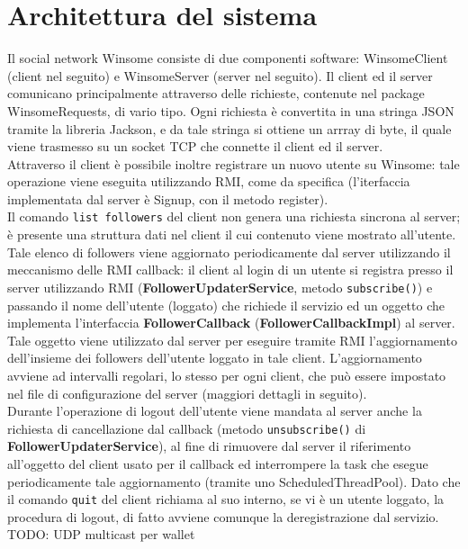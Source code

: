 \section{Architettura del sistema}
Il social network Winsome consiste di due componenti software: WinsomeClient (client nel seguito)
 e WinsomeServer (server nel seguito). Il client ed il server comunicano principalmente 
 attraverso delle richieste, contenute nel package WinsomeRequests, di vario tipo. 
 Ogni richiesta è convertita in una stringa JSON tramite la libreria Jackson, e da 
 tale stringa si ottiene un arrray di byte, il quale viene trasmesso su un socket TCP che connette
 il client ed il server.\\
 Attraverso il client è possibile inoltre registrare un nuovo utente su Winsome: tale operazione 
 viene eseguita utilizzando RMI, come da specifica (l'iterfaccia implementata dal server è Signup, 
 con il metodo register).\\
 Il comando \verb|list followers| del client non genera una richiesta sincrona al server; 
 è presente una struttura dati nel client il cui contenuto viene mostrato all'utente. 
 Tale elenco di followers viene aggiornato periodicamente dal server utilizzando il meccanismo 
 delle RMI callback: il client al login di un utente si registra presso il server utilizzando RMI
 (\textbf{FollowerUpdaterService}, metodo \verb|subscribe()|) e passando il nome dell'utente 
 (loggato) che richiede il servizio ed un oggetto che implementa l'interfaccia \textbf{FollowerCallback} 
 (\textbf{FollowerCallbackImpl}) al server. Tale oggetto viene utilizzato dal server per eseguire 
 	tramite RMI l'aggiornamento dell'insieme dei followers dell'utente loggato in tale client.
 	L'aggiornamento avviene ad intervalli regolari, lo stesso per ogni client, che può essere
 	impostato nel file di configurazione del server (maggiori dettagli in seguito).\\
 Durante l'operazione di logout dell'utente viene mandata al server anche la richiesta di cancellazione
 dal callback (metodo \verb|unsubscribe()| di \textbf{FollowerUpdaterService}), al fine di rimuovere
 dal server il riferimento all'oggetto del client usato per il callback ed interrompere la task
 che esegue periodicamente tale aggiornamento (tramite uno ScheduledThreadPool). Dato che il comando
 \verb|quit| del client richiama al suo interno, se vi è un utente loggato, la procedura di logout,
 di fatto avviene comunque la deregistrazione dal servizio.\\
TODO: UDP multicast per wallet